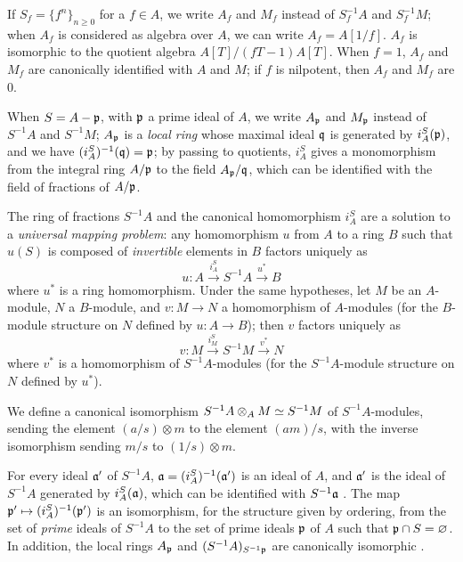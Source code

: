 \begin{env}[1.2.3]
\label{0.1.2.3}
If $S_f=\{f^n\}_{n\geqslant 0}$ for a $f\in A$, we write $A_f$ and $M_f$ instead
of $S_f^{-1}A$ and $S_f^{-1}M$; when $A_f$ is considered as algebra over $A$, we
can write $A_f=A[1/f]$. $A_f$ is isomorphic to the quotient algebra
$A[T]/(fT-1)A[T]$. When $f=1$, $A_f$ and $M_f$ are canonically identified with $A$ and
$M$; if $f$ is nilpotent, then $A_f$ and $M_f$ are $0$.

When $S=A-\mathfrak{p}$, with $\mathfrak{p}$ a prime ideal of $A$, we write
$A_\mathfrak{p}$ and $M_\mathfrak{p}$ instead of $S^{-1}A$ and $S^{-1}M$;
$A_\mathfrak{p}$ is a \emph{local ring} whose maximal ideal $\mathfrak{q}$ is
generated by $i_A^S(\mathfrak{p})$, and we have
$(i_A^S)^{-1}(\mathfrak{q})=\mathfrak{p}$; by passing to quotients, $i_A^S$
gives a monomorphism from the integral ring $A/\mathfrak{p}$ to the field
$A_\mathfrak{p}/\mathfrak{q}$, which can be identified with the field of fractions of
$A/\mathfrak{p}$.
\end{env}

\begin{env}[1.2.4]
\label{0.1.2.4}
The ring of fractions $S^{-1}A$ and the canonical homomorphism $i_A^S$ are a
solution to a \emph{universal mapping problem}: any homomorphism $u$ from $A$ to
a ring $B$ such that $u(S)$ is composed of \emph{invertible} elements in $B$
factors uniquely as
\[
  u:A\xrightarrow{i_A^S}S^{-1}A\xrightarrow{u^*}B
\]
where
$u^*$ is a ring homomorphism. Under the same hypotheses, let $M$ be an
$A$-module, $N$ a $B$-module, and $v:M\to N$ a homomorphism of $A$-modules (for
the $B$-module structure on $N$ defined by $u:A\to B$); then $v$ factors
uniquely as
\[
  v:M\xrightarrow{i_M^S}S^{-1}M\xrightarrow{v^*}N
\]
where $v^*$ is a homomorphism of $S^{-1}A$-modules (for the $S^{-1}A$-module
structure on $N$ defined by $u^*$).
\end{env}

\begin{env}[1.2.5]
\label{0.1.2.5}
We define a canonical isomorphism $S^{-1}A\otimes_A M\simeq S^{-1}M$ of
$S^{-1}A$-modules, sending the element $(a/s)\otimes m$ to the element $(am)/s$,
with the inverse isomorphism sending $m/s$ to $(1/s)\otimes m$.
\end{env}

\begin{env}[1.2.6]
\label{0.1.2.6}
For every ideal $\mathfrak{a}'$ of $S^{-1}A$,
$\mathfrak{a}=(i_A^S)^{-1}(\mathfrak{a}')$ is an ideal of $A$, and
$\mathfrak{a}'$ is the ideal of $S^{-1}A$ generated by $i_A^S(\mathfrak{a})$,
which can be identified with $S^{-1}\mathfrak{a}$ . The map
$\fk{p}'\mapsto(i_A^S)^{-1}(\fk{p}')$ is an isomorphism, for the structure given by ordering, from the set of \emph{prime} ideals of $S^{-1}A$ to the set of
prime ideals $\mathfrak{p}$ of $A$ such that $\mathfrak{p}\cap S=\varnothing$. In
addition, the local rings $A_\mathfrak{p}$ and $(S^{-1}A)_{S^{-1}\mathfrak{p}}$
are canonically isomorphic .
\end{env}

